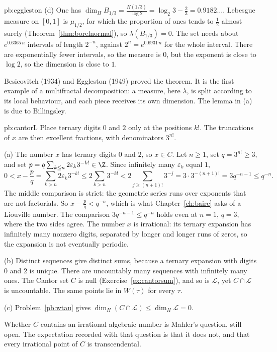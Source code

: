 \begin{solution}{pb:eggleston}
(d) One has $\dim_HB_{1/3}=\frac{H(1/3)}{\log 2}=\log_2 3-\frac23=0.9182\ldots$. Lebesgue measure on $[0,1]$ is $\mu_{1/2}$, for which the proportion of ones tends to $\frac12$ almost surely (Theorem~\ref{thm:borelnormal}), so $\lambda(B_{1/3})=0$. The set needs about $e^{0.6365\, n}$ intervals of length $2^{-n}$, against $2^n=e^{0.6931\, n}$ for the whole interval. There are exponentially fewer intervals, so the measure is $0$, but the exponent is close to $\log 2$, so the dimension is close to $1$.

\leads Besicovitch (1934) and Eggleston (1949) proved the theorem. It is the first example of a multifractal decomposition: a measure, here $\lambda$, is split according to its local behaviour, and each piece receives its own dimension. The lemma in (a) is due to Billingsley.
\end{solution}

\begin{solution}{pb:cantorL}
\idea Place ternary digits $0$ and $2$ only at the positions $k!$. The truncations of $x$ are then excellent fractions, with denominators $3^{n!}$.

\writeup (a) The number $x$ has ternary digits $0$ and $2$, so $x\in C$. Let $n\ge 1$, set $q=3^{n!}\ge 3$, and set $p=q\sum_{k\le n}2\varepsilon_k 3^{-k!}\in\Z$. Since infinitely many $\varepsilon_k$ equal $1$,
\[
0<x-\frac pq=\sum_{k>n}2\varepsilon_k 3^{-k!}\le 2\sum_{k>n}3^{-k!}<2\sum_{j\ge(n+1)!}3^{-j}=3\cdot 3^{-(n+1)!}=3q^{-n-1}\le q^{-n}.
\]
The middle comparison is strict: the geometric series runs over exponents that are not factorials. So $x-\frac pq<q^{-n}$, which is what Chapter~\ref{ch:baire} asks of a Liouville number. The comparison $3q^{-n-1}\le q^{-n}$ holds even at $n=1$, $q=3$, where the two sides agree. The number $x$ is irrational: its ternary expansion has infinitely many nonzero digits, separated by longer and longer runs of zeros, so the expansion is not eventually periodic.

(b) Distinct sequences give distinct sums, because a ternary expansion with digits $0$ and $2$ is unique. There are uncountably many sequences with infinitely many ones. The Cantor set $C$ is null (Exercise~\ref{ex:cantorsum}), and so is $\mathcal L$, yet $C\cap\mathcal L$ is uncountable. The same points lie in $W(\tau)$ for every $\tau$.

(c) Problem~\ref{pb:wtau} gives $\dim_H(C\cap\mathcal L)\le\dim_H\mathcal L=0$.

\leads Whether $C$ contains an irrational algebraic number is Mahler's question, still open. The expectation recorded with that question is that it does not, and that every irrational point of $C$ is transcendental.
\end{solution}


